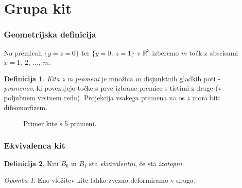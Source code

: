\documentclass[9pt, table]{beamer}
\theoremstyle{remark}
\newtheorem*{op}{Opomba}
\theoremstyle{definition}
\newtheorem{defi}{Definicija}
\begin{document}
\section{Grupa kit}
\begin{frame}
\frametitle{Geometrijska definicija}
Na premicah $\{y = z = 0\}$ ter $\{y = 0,\ z = 1\}$ v $\mathbb{R}^3$ izberemo $m$ točk z abscisami $x=1,\ 2,\ \ldots,\ m$.
\vspace{0.2cm}
\pause
\begin{defi}
\emph{Kita z m prameni} je množica $m$ disjunktnih gladkih poti - \emph{pramenov}, ki povezujejo točke s prve izbrane premice s tistimi z druge (v poljubnem vrstnem redu).  Projekcija vsakega pramena na os $z$ mora biti difeomorfizem.
\end{defi}
\vspace{0.5cm}
\begin{figure}
\caption{Primer kite s 5 prameni.}
\end{figure}
\end{frame}

\begin{frame}
\frametitle{Ekvivalenca kit}
\begin{defi}
Kiti $B_0$ in $B_1$ sta \emph{ekvivalentni}, če sta \emph{izotopni}.
\end{defi}
\pause
\begin{op}
Eno vložitev kite lahko zvezno deformiramo v drugo.
\end{op}
\end{frame}
\end{document}
